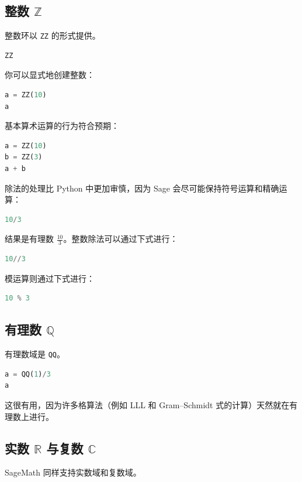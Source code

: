 \subsection{整数 $\mathbb{Z}$}
整数环以 \texttt{ZZ} 的形式提供。

\begin{lstlisting}[language=Python]
ZZ
\end{lstlisting}

你可以显式地创建整数：

\begin{lstlisting}[language=Python]
a = ZZ(10)
a
\end{lstlisting}

基本算术运算的行为符合预期：

\begin{lstlisting}[language=Python]
a = ZZ(10)
b = ZZ(3)
a + b
\end{lstlisting}

除法的处理比 Python 中更加审慎，因为 Sage 会尽可能保持符号运算和精确运算：

\begin{lstlisting}[language=Python]
10/3
\end{lstlisting}

结果是有理数 $\frac{10}{3}$。整数除法可以通过下式进行：

\begin{lstlisting}[language=Python]
10//3
\end{lstlisting}

模运算则通过下式进行：

\begin{lstlisting}[language=Python]
10 % 3
\end{lstlisting}

\subsection{有理数 $\mathbb{Q}$}
有理数域是 \texttt{QQ}。

\begin{lstlisting}[language=Python]
a = QQ(1)/3
a
\end{lstlisting}

这很有用，因为许多格算法（例如 LLL 和 Gram--Schmidt 式的计算）天然就在有理数上进行。

\subsection{实数 $\mathbb{R}$ 与复数 $\mathbb{C}$}
SageMath 同样支持实数域和复数域。

